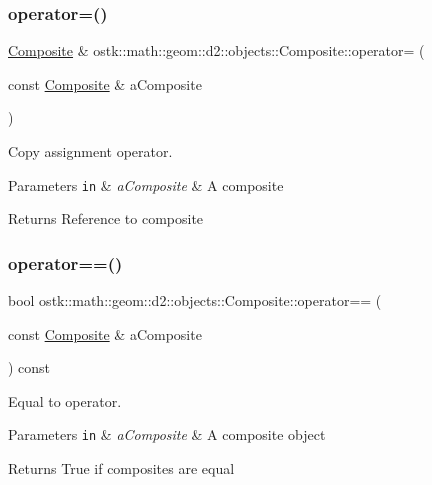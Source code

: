 \subsubsection{\texorpdfstring{operator=()}{operator=()}}
{\footnotesize\ttfamily \hyperlink{classostk_1_1math_1_1geom_1_1d2_1_1objects_1_1_composite}{Composite} \& ostk\+::math\+::geom\+::d2\+::objects\+::\+Composite\+::operator= (\begin{DoxyParamCaption}\item[{const \hyperlink{classostk_1_1math_1_1geom_1_1d2_1_1objects_1_1_composite}{Composite} \&}]{a\+Composite }\end{DoxyParamCaption})}



Copy assignment operator. 


\begin{DoxyParams}[1]{Parameters}
\mbox{\tt in}  & {\em a\+Composite} & A composite \\
\hline
\end{DoxyParams}
\begin{DoxyReturn}{Returns}
Reference to composite 
\end{DoxyReturn}
\mbox{\label{classostk_1_1math_1_1geom_1_1d2_1_1objects_1_1_composite_aa3de9eb61172d4ab9ffbc901ef89a6cd}} 
\subsubsection{\texorpdfstring{operator==()}{operator==()}}
{\footnotesize\ttfamily bool ostk\+::math\+::geom\+::d2\+::objects\+::\+Composite\+::operator== (\begin{DoxyParamCaption}\item[{const \hyperlink{classostk_1_1math_1_1geom_1_1d2_1_1objects_1_1_composite}{Composite} \&}]{a\+Composite }\end{DoxyParamCaption}) const}



Equal to operator. 


\begin{DoxyParams}[1]{Parameters}
\mbox{\tt in}  & {\em a\+Composite} & A composite object \\
\hline
\end{DoxyParams}
\begin{DoxyReturn}{Returns}
True if composites are equal 
\end{DoxyReturn}
\mbox{\label{classostk_1_1math_1_1geom_1_1d2_1_1objects_1_1_composite_ae6e95f806b1cb5e026b484f5c3291d88}} 
